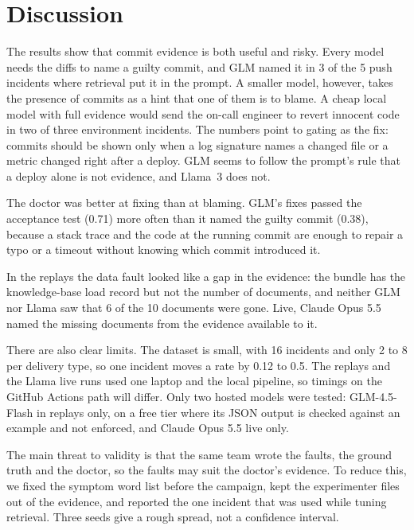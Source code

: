\documentclass[12pt,onecolumn,draftclsnofoot]{IEEEtran}
\begin{document}
\section{Discussion}\label{sec:discussion}

The results show that commit evidence is both useful and risky. Every model needs the diffs to name a guilty commit, and GLM named it in 3 of the 5 push incidents where retrieval put it in the prompt. A smaller model, however, takes the presence of commits as a hint that one of them is to blame. A cheap local model with full evidence would send the on-call engineer to revert innocent code in two of three environment incidents. The numbers point to gating as the fix: commits should be shown only when a log signature names a changed file or a metric changed right after a deploy. GLM seems to follow the prompt's rule that a deploy alone is not evidence, and Llama~3 does not.

The doctor was better at fixing than at blaming. GLM's fixes passed the acceptance test (0.71) more often than it named the guilty commit (0.38), because a stack trace and the code at the running commit are enough to repair a typo or a timeout without knowing which commit introduced it.

In the replays the data fault looked like a gap in the evidence: the bundle has the knowledge-base load record but not the number of documents, and neither GLM nor Llama saw that 6 of the 10 documents were gone. Live, Claude Opus 5.5 named the missing documents from the evidence available to it.

There are also clear limits. The dataset is small, with 16 incidents and only 2 to 8 per delivery type, so one incident moves a rate by 0.12 to 0.5. The replays and the Llama live runs used one laptop and the local pipeline, so timings on the GitHub Actions path will differ. Only two hosted models were tested: GLM-4.5-Flash in replays only, on a free tier where its JSON output is checked against an example and not enforced, and Claude Opus 5.5 live only.

The main threat to validity is that the same team wrote the faults, the ground truth and the doctor, so the faults may suit the doctor's evidence. To reduce this, we fixed the symptom word list before the campaign, kept the experimenter files out of the evidence, and reported the one incident that was used while tuning retrieval. Three seeds give a rough spread, not a confidence interval.
\end{document}

